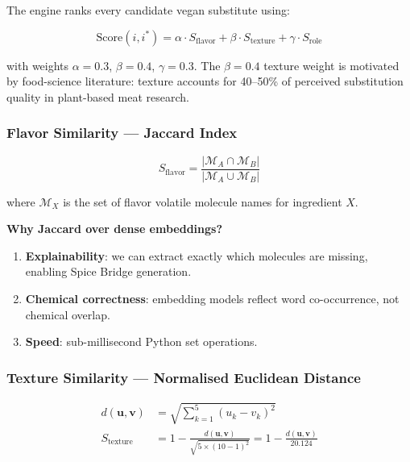 \documentclass[12pt, a4paper]{article}
\begin{document}
The engine ranks every candidate vegan substitute using:

\begin{equation}
\boxed{\text{Score}(i, i^*) = \alpha \cdot S_{\text{flavor}} + \beta \cdot S_{\text{texture}} + \gamma \cdot S_{\text{role}}}
\label{eq:composite}
\end{equation}

\noindent with weights $\alpha = 0.3$, $\beta = 0.4$, $\gamma = 0.3$.  The $\beta = 0.4$
texture weight is motivated by food-science literature: texture accounts for 40--50\% of
perceived substitution quality in plant-based meat research.

\subsubsection{Flavor Similarity --- Jaccard Index}

\begin{equation}
S_{\text{flavor}} = \frac{|\mathcal{M}_A \cap \mathcal{M}_B|}{|\mathcal{M}_A \cup \mathcal{M}_B|}
\label{eq:jaccard}
\end{equation}

where $\mathcal{M}_X$ is the set of flavor volatile molecule names for ingredient $X$.

\noindent\textbf{Why Jaccard over dense embeddings?}
\begin{enumerate}
  \item \textbf{Explainability}: we can extract exactly which molecules are missing, enabling Spice Bridge generation.
  \item \textbf{Chemical correctness}: embedding models reflect word co-occurrence, not chemical overlap.
  \item \textbf{Speed}: sub-millisecond Python set operations.
\end{enumerate}

\subsubsection{Texture Similarity --- Normalised Euclidean Distance}

\begin{align}
d(\mathbf{u}, \mathbf{v}) &= \sqrt{\sum_{k=1}^{5} (u_k - v_k)^2} \label{eq:euclid}\\
S_{\text{texture}} &= 1 - \frac{d(\mathbf{u}, \mathbf{v})}{\sqrt{5 \times (10-1)^2}}
                     = 1 - \frac{d(\mathbf{u}, \mathbf{v})}{20.124} \label{eq:texsim}
\end{align}
\end{document}
